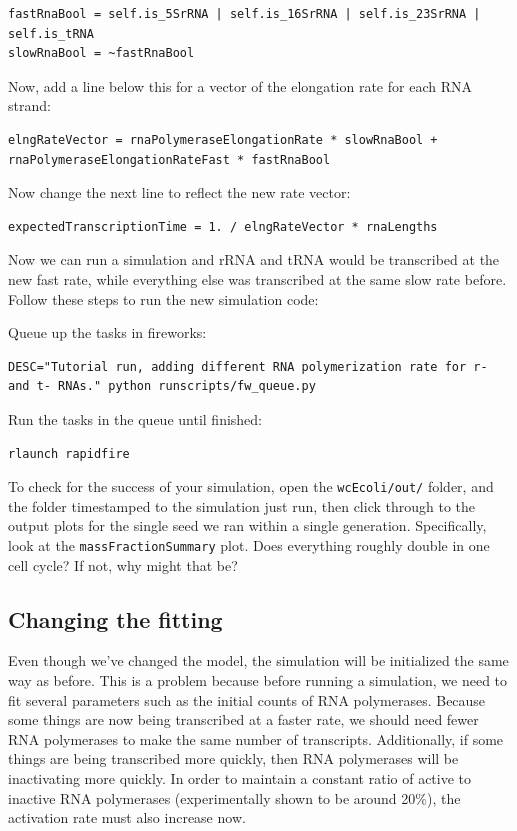 \documentclass[12pt]{article}
\begin{document}
\begin{lstlisting}
fastRnaBool = self.is_5SrRNA | self.is_16SrRNA | self.is_23SrRNA | self.is_tRNA
slowRnaBool = ~fastRnaBool
\end{lstlisting}

Now, add a line below this for a vector of the elongation rate for each RNA strand:

\begin{lstlisting}
elngRateVector = rnaPolymeraseElongationRate * slowRnaBool +  rnaPolymeraseElongationRateFast * fastRnaBool
\end{lstlisting}

Now change the next line to reflect the new rate vector:

\begin{lstlisting}
expectedTranscriptionTime = 1. / elngRateVector * rnaLengths
\end{lstlisting}

\par
Now we can run a simulation and rRNA and tRNA would be transcribed at the new fast rate, while everything else was transcribed at the same slow rate before. Follow these steps to run the new simulation code:
\par
Queue up the tasks in fireworks:

\lstset{language=bash}
\begin{lstlisting}
DESC="Tutorial run, adding different RNA polymerization rate for r- and t- RNAs." python runscripts/fw_queue.py
\end{lstlisting}

Run the tasks in the queue until finished:

\begin{lstlisting}
rlaunch rapidfire
\end{lstlisting}

To check for the success of your simulation, open the \texttt{wcEcoli/out/} folder, and the folder timestamped to the simulation just run, then click through to the output plots for the single seed we ran within a single generation. Specifically, look at the \texttt{massFractionSummary} plot. Does everything roughly double in one cell cycle? If not, why might that be?

\subsection{Changing the fitting}

Even though we've changed the model, the simulation will be initialized the same way as before. This is a problem because before running a simulation, we need to fit several parameters such as the initial counts of RNA polymerases. Because some things are now being transcribed at a faster rate, we should need fewer RNA polymerases to make the same number of transcripts. Additionally, if some things are being transcribed more quickly, then RNA polymerases will be inactivating more quickly. In order to maintain a constant ratio of active to inactive RNA polymerases (experimentally shown to be around 20\%), the activation rate must also increase now. 
\end{document}
